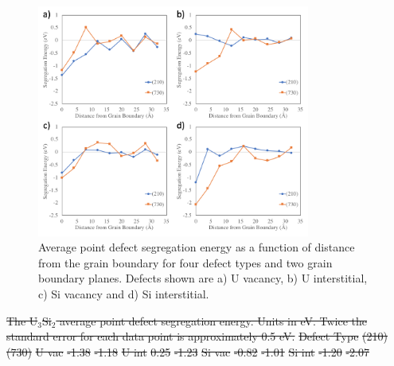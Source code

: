 \documentclass[review]{elsarticle}
\providecommand{\DIFdeltex}[1]{{\protect\color{red}\sout{#1}}}                      %
\providecommand{\DIFdelbegin}{} %
\providecommand{\DIFdelend}{} %
\providecommand{\DIFdelFL}[1]{\DIFdel{#1}} %
\providecommand{\DIFdel}[1]{\texorpdfstring{\DIFdeltex{#1}}{}} %
\newcommand{\DIFscaledelfig}{0.5}
\newlength{\DIFdelgraphicswidth} %
\newlength{\DIFdelgraphicsheight} %
\newcommand{\DIFdelincludegraphics}[2][]{%
\sbox{\DIFdelgraphicsbox}{\DIFOincludegraphics[#1]{#2}}%
\settoboxwidth{\DIFdelgraphicswidth}{\DIFdelgraphicsbox} %
\settoboxtotalheight{\DIFdelgraphicsheight}{\DIFdelgraphicsbox} %
\scalebox{\DIFscaledelfig}{%
\parbox[b]{\DIFdelgraphicswidth}{\usebox{\DIFdelgraphicsbox}\\[-\baselineskip] \rule{\DIFdelgraphicswidth}{0em}}\llap{\resizebox{\DIFdelgraphicswidth}{\DIFdelgraphicsheight}{%
\setlength{\unitlength}{\DIFdelgraphicswidth}%
\begin{picture}(1,1)%
\thicklines\linethickness{2pt} %
{\color[rgb]{1,0,0}\put(0,0){\framebox(1,1){}}}%
{\color[rgb]{1,0,0}\put(0,0){\line( 1,1){1}}}%
{\color[rgb]{1,0,0}\put(0,1){\line(1,-1){1}}}%
\end{picture}%
}\hspace*{3pt}}} %
} %
\DeclareRobustCommand{\DIFdelbegin}{\DIFOdelbegin \let\includegraphics\DIFdelincludegraphics} %
\DeclareRobustCommand{\DIFdelend}{\DIFOaddend \let\includegraphics\DIFOincludegraphics} %
\begin{document}

\DIFdelend \begin{figure}[h]
 \centering
 \includegraphics[width=0.8\textwidth]{gbdefs_seg.png} 
 \caption{Average point defect segregation energy as a function of distance from the grain boundary for four defect types and two grain boundary planes. Defects shown are a) U vacancy, b) U interstitial, c) Si vacancy and d) Si interstitial. }
 \label{fig:seg}
\end{figure}

\FloatBarrier

\DIFdelbegin %
{%
\DIFdelFL{The U$_{3}$Si$_{2}$ average point defect segregation energy. Units in eV. Twice the standard error for each data point is approximately 0.5 eV.}} %
\DIFdelFL{Defect Type }%
\DIFdelFL{(210) }%
\DIFdelFL{(730)}%
\DIFdelFL{U vac }%
\DIFdelFL{-1.38 }%
\DIFdelFL{-1.18	 }%
\DIFdelFL{U int }%
\DIFdelFL{0.25 }%
\DIFdelFL{-1.23 }%
\DIFdelFL{Si vac }%
\DIFdelFL{-0.82 }%
\DIFdelFL{-1.01	 }%
\DIFdelFL{Si int }%
\DIFdelFL{-1.20 }%
\DIFdelFL{-2.07 }%
\end{document}

